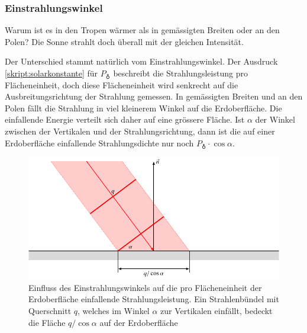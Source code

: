 \subsubsection{Einstrahlungswinkel}
Warum ist es in den Tropen wärmer als in gemässigten Breiten oder
an den Polen?
Die Sonne strahlt doch überall mit der gleichen Intensität.

Der Unterschied stammt natürlich vom Einstrahlungswinkel.
Der Ausdruck \eqref{skript:solarkonstante} für $P_{\earth}$ 
beschreibt die Strahlungsleistung pro Flächeneinheit, doch diese
Flächeneinheit wird senkrecht auf die Ausbreitungsrichtung der
Strahlung gemessen.
In gemässigten Breiten und an den Polen fällt die Strahlung 
in viel kleinerem Winkel auf die Erdoberfläche.
Die einfallende Energie verteilt sich daher auf eine grössere
Fläche.
Ist $\alpha$ der Winkel zwischen der Vertikalen und der Strahlungsrichtung,
dann ist die auf einer Erdoberfläche einfallende Strahlungsdichte nur
noch $P_{\earth}\cdot\cos\alpha$.

\begin{figure}
\centering
\includegraphics{chapters/1/einfall.pdf}
\caption{Einfluss des Einstrahlungswinkels auf die pro Flächeneinheit
der Erdoberfläche einfallende Strahlungsleistung.
Ein Strahlenbündel mit Querschnitt $q$, welches im Winkel
$\alpha$ zur Vertikalen einfällt, bedeckt die Fläche $q/\cos\alpha$
auf der Erdoberfläche
\label{skript:einfallswinkel}}
\end{figure}

